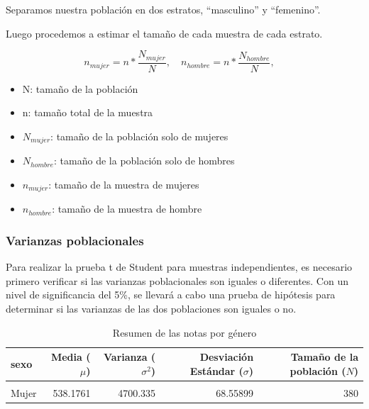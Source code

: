 \documentclass[
]{article}
\begin{document}
Separamos nuestra población en dos estratos, ``masculino'' y
``femenino''.

Luego procedemos a estimar el tamaño de cada muestra de cada estrato.

\[n_{mujer}= n*\frac{N_{mujer}}{N}, \quad n_{hombre}= n*\frac{N_{hombre}}{N}, \quad \]

\begin{itemize}
    \item N: tamaño de la población 
    \item n: tamaño total de la muestra
    \item $N_{mujer}$: tamaño de la población solo de mujeres
    \item $N_{hombre}$: tamaño de la población solo de hombres
    \item $n_{mujer}$: tamaño de la muestra de mujeres
    \item $n_{hombre}$: tamaño de la muestra de hombre

\end{itemize}

\subsubsection*{Varianzas poblacionales}\label{varianzas-poblacionales}

Para realizar la prueba t de Student para muestras independientes, es
necesario primero verificar si las varianzas poblacionales son iguales o
diferentes. Con un nivel de significancia del 5\%, se llevará a cabo una
prueba de hipótesis para determinar si las varianzas de las dos
poblaciones son iguales o no.

\begin{table}[!h]
\centering
\caption{\label{tab:Estadisticas generos}Resumen de las notas por género}
\centering
\begin{tabular}[t]{lrrrr}
\toprule
sexo & Media (\(\mu\)) & Varianza (\(\sigma^{2}\)) & Desviación Estándar (\(\sigma\)) & Tamaño de la población (\(N\))\\
\midrule
\cellcolor{gray!10}{Hombre} & \cellcolor{gray!10}{549.3282} & \cellcolor{gray!10}{4936.985} & \cellcolor{gray!10}{70.26368} & \cellcolor{gray!10}{342}\\
Mujer & 538.1761 & 4700.335 & 68.55899 & 380\\
\bottomrule
\end{tabular}
\end{table}
\end{document}
